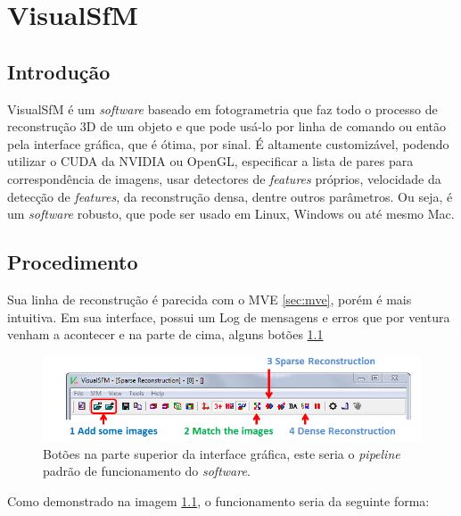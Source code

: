 \chapter{VisualSfM}\label{sec:visualsfm}
%
\section*{Introdução}

VisualSfM é um {\it software} baseado em fotogrametria que faz todo o processo de reconstrução 3D de um objeto e que pode usá-lo por linha de comando ou então pela interface gráfica, que é ótima, por sinal. É altamente customizável, podendo utilizar o CUDA da NVIDIA ou OpenGL, especificar a lista de pares para correspondência de imagens, usar detectores de {\it features} próprios, velocidade da detecção de {\it features}, da reconstrução densa, dentre outros parâmetros. Ou seja, é um {\it software} robusto, que pode ser usado em Linux, Windows ou até mesmo Mac.

\section*{Procedimento}

Sua linha de reconstrução é parecida com o MVE \ref{sec:mve}, porém é mais intuitiva. Em sua interface, possui um Log de mensagens e erros que por ventura venham a acontecer e na parte de cima, alguns botões \ref{fig:pipelineVisualSfM}

\begin{figure}[!h]
	\centering

	\includegraphics[width=1\linewidth]{figs/pipelinevisualsfm.png}
	\caption{%
	Botões na parte superior da interface gráfica, este seria o {\it pipeline} padrão de funcionamento do {\it software}.
	}\label{fig:pipelineVisualSfM}
\end{figure}

Como demonstrado na imagem \ref{fig:pipelineVisualSfM}, o funcionamento seria da seguinte forma:

